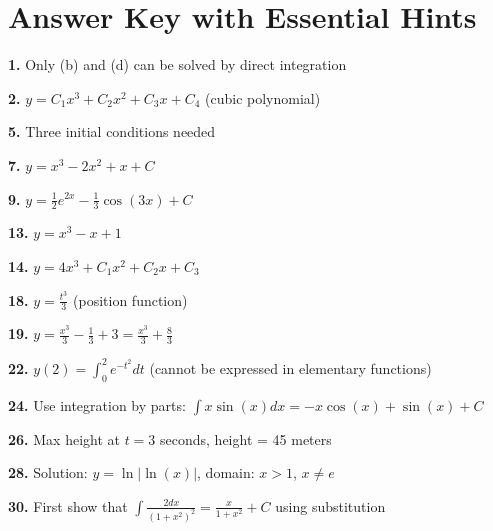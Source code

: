 \documentclass[12pt]{article}
\begin{document}
\section*{Answer Key with Essential Hints}

\textbf{1.} Only (b) and (d) can be solved by direct integration

\textbf{2.} $y = C_1x^3 + C_2x^2 + C_3x + C_4$ (cubic polynomial)

\textbf{5.} Three initial conditions needed

\textbf{7.} $y = x^3 - 2x^2 + x + C$

\textbf{9.} $y = \frac{1}{2}e^{2x} - \frac{1}{3}\cos(3x) + C$

\textbf{13.} $y = x^3 - x + 1$

\textbf{14.} $y = 4x^3 + C_1x^2 + C_2x + C_3$

\textbf{18.} $y = \frac{t^3}{3}$ (position function)

\textbf{19.} $y = \frac{x^3}{3} - \frac{1}{3} + 3 = \frac{x^3}{3} + \frac{8}{3}$

\textbf{22.} $y(2) = \int_0^2 e^{-t^2}dt$ (cannot be expressed in elementary functions)

\textbf{24.} Use integration by parts: $\int x\sin(x)dx = -x\cos(x) + \sin(x) + C$

\textbf{26.} Max height at $t = 3$ seconds, height = 45 meters

\textbf{28.} Solution: $y = \ln|\ln(x)|$, domain: $x > 1$, $x \neq e$

\textbf{30.} First show that $\int \frac{2dx}{(1+x^2)^2} = \frac{x}{1+x^2} + C$ using substitution
\end{document}
